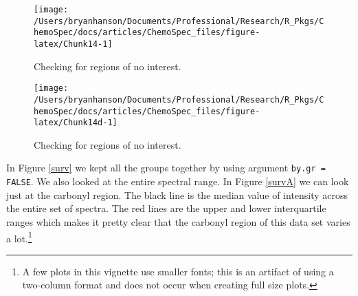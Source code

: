\documentclass[letter,10pt,twocolumn,twoside,printwatermark=false]{pinp}
\begin{document}
\begin{Shaded}
\begin{Highlighting}[]
   \NormalTok{,}
   \NormalTok{)}
\end{Highlighting}
\end{Shaded}

\begin{figure}

{\centering \texttt{[image: /Users/bryanhanson/Documents/Professional/Research/R\_Pkgs/ChemoSpec/docs/articles/ChemoSpec\_files/figure-latex/Chunk14-1]} 

}

\caption{\label{surv}Checking for regions of no interest.}\label{fig:Chunk14}
\end{figure}

\begin{Shaded}
\begin{Highlighting}[]
   \NormalTok{,}
\end{Highlighting}
\end{Shaded}

\begin{figure}

{\centering \texttt{[image: /Users/bryanhanson/Documents/Professional/Research/R\_Pkgs/ChemoSpec/docs/articles/ChemoSpec\_files/figure-latex/Chunk14d-1]} 

}

\caption{\label{surv2}Checking for regions of no interest.}\label{fig:Chunk14d}
\end{figure}

In Figure \ref{surv} we kept all the groups together by using argument
\texttt{by.gr = FALSE}. We also looked at the entire spectral range. In
Figure \ref{survA} we can look just at the carbonyl region. The black
line is the median value of intensity across the entire set of spectra.
The red lines are the upper and lower interquartile ranges which makes
it pretty clear that the carbonyl region of this data set varies a
lot.\footnote{A few plots in this vignette use smaller fonts; this is an artifact of using a two-column format and does not occur when creating full size plots.}

\begin{Shaded}
\begin{Highlighting}[]
   \NormalTok{,}
   \NormalTok{,}
   \NormalTok{,}
   \NormalTok{(}\NormalTok{, }\NormalTok{))}
\end{Highlighting}
\end{Shaded}
\end{document}
